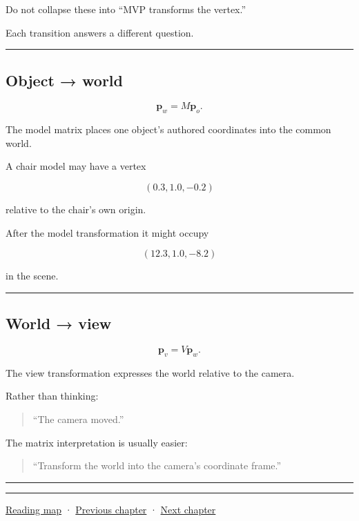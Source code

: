 Do not collapse these into ``MVP transforms the vertex.''

Each transition answers a different question.

\begin{center}\rule{0.5\linewidth}{0.5pt}\end{center}

\subsection{Object → world}\label{03-visual-computing-i-ch012-object-world}

\[
\mathbf p_w=M\mathbf p_o.
\]

The model matrix places one object's authored coordinates into the common world.

A chair model may have a vertex

\[
(0.3,1.0,-0.2)
\]

relative to the chair's own origin.

After the model transformation it might occupy

\[
(12.3,1.0,-8.2)
\]

in the scene.

\begin{center}\rule{0.5\linewidth}{0.5pt}\end{center}

\subsection{World → view}\label{03-visual-computing-i-ch012-world-view}

\[
\mathbf p_v=V\mathbf p_w.
\]

The view transformation expresses the world relative to the camera.

Rather than thinking:

\begin{quote}
``The camera moved.''
\end{quote}

The matrix interpretation is usually easier:

\begin{quote}
``Transform the world into the camera's coordinate frame.''
\end{quote}

\begin{center}\rule{0.5\linewidth}{0.5pt}\end{center}

\begin{center}\rule{0.5\linewidth}{0.5pt}\end{center}

\hyperref[volume-reading-map]{Reading map} · \hyperref[03-visual-computing-i-ch011]{Previous chapter} · \hyperref[03-visual-computing-i-ch013]{Next chapter}
